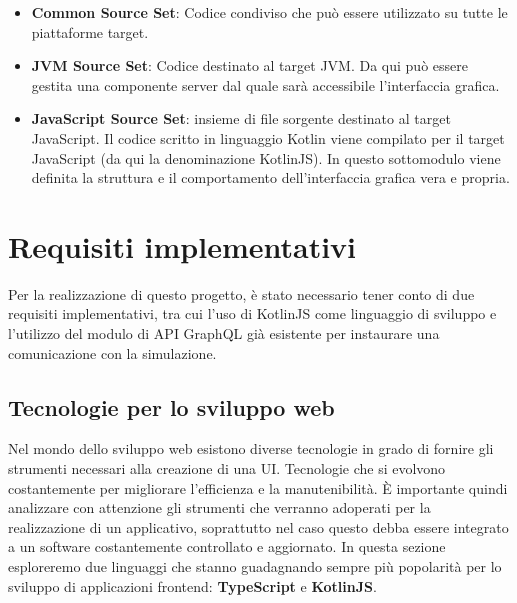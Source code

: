 \begin{itemize}
	\item \textbf{Common Source Set}: Codice condiviso che può essere utilizzato su tutte le piattaforme target. 
	\item \textbf{JVM Source Set}: Codice destinato al target \ac{JVM}. Da qui può essere gestita una componente server dal quale sarà accessibile l'interfaccia grafica.
	\item \textbf{JavaScript Source Set}: insieme di file sorgente destinato al target JavaScript. Il codice scritto in linguaggio Kotlin viene compilato per il target JavaScript (da qui la denominazione KotlinJS). In questo sottomodulo viene definita la struttura e il comportamento dell'interfaccia grafica vera e propria.
\end{itemize}
\section{Requisiti implementativi}
Per la realizzazione di questo progetto, è stato necessario tener conto di due requisiti implementativi, tra cui l'uso di KotlinJS come linguaggio di sviluppo e l'utilizzo del modulo di API GraphQL già esistente per instaurare una comunicazione con la simulazione. 
\subsection{Tecnologie per lo sviluppo web}
Nel mondo dello sviluppo web esistono diverse tecnologie in grado di fornire gli strumenti necessari alla creazione di una \ac{UI}. Tecnologie che si evolvono costantemente per migliorare l'efficienza e la manutenibilità. È importante quindi analizzare con attenzione gli strumenti che verranno adoperati per la realizzazione di un applicativo, soprattutto nel caso questo debba essere integrato a un software costantemente controllato e aggiornato. In questa sezione esploreremo due linguaggi che stanno guadagnando sempre più popolarità per lo sviluppo di applicazioni frontend: \textbf{TypeScript} e \textbf{KotlinJS}.
